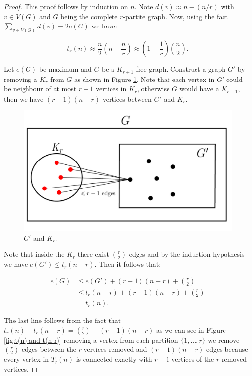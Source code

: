 \documentclass[12pt,twoside,a4paper]{book}
\numberwithin{equation}{section}
\theoremstyle{remark}
\begin{document}
\begin{proof}
This proof follows by induction on $n$. Note $d(v) \approx n-(n/r)$ with $v \in V(G)$ and $G$ being the complete $r$-partite graph. Now, using the fact $\sum_{v\in V(G)} d(v) = 2 e(G)$ we have:

$$ t_r(n) \approx \frac{n}{2}\left(n-\frac{n}{r}\right) \approx \left(1-\frac{1}{r}\right) \binom{n}{2}.$$


 Let $e(G)$ be maximum and $G$ be a $K_{r+1}$-free graph. Construct a graph $G'$ by removing a $K_r$ from $G$ as shown in Figure \ref{fig:G'andKr}. Note that each vertex in $G'$ could be neighbour of at most $r-1$ vertices in $K_r$, otherwise $G$ would have a $K_{r+1}$, then we have $(r-1)(n-r)$ vertices between $G'$ and $K_r$.
 
 \begin{figure}[H]
     \centering
     \includegraphics[scale=1]{Figuras/Kr+1-livre-prova-turan.jpg}
     \caption{$G'$ and $K_r$.}
     \label{fig:G'andKr}
\end{figure}

Note that inside the $K_r$ there exist $\binom{r}{2}$ edges and by the induction hypothesis we have $e(G') \leq t_r(n-r)$. Then it follows that:

\begin{align*}
e(G) &\leq e(G') + (r-1)(n-r) + \binom{r}{2}\\
&\leq t_r(n-r) +(r-1)(n-r) + \binom{r}{2}\\
&= t_r(n).
\end{align*}

The last line follows from the fact that $t_r(n) - t_r(n-r) = \binom{r}{2} + (r-1)(n-r)$ as we can see in Figure \ref{fig:t(n)-and-t(n-r)} removing a vertex from each partition $\{1,...,r\}$ we remove $\binom{r}{2}$ edges between the $r$ vertices removed and $(r-1)(n-r)$ edges  because every vertex in $T_r(n)$ is connected exactly with $r-1$ vertices of the $r$ removed vertices.   


\end{proof}
\end{document}
